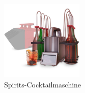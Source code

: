 \begin{figure}[h]
	\centering
	\includegraphics[width=0.35\textwidth]{graphics/Spirits.JPG}
	\caption{Spirits-Cocktailmaschine \cite{koths_spirits_nodate}}
	\label{fig:Spirits_Cocktailmaschine}
\end{figure}